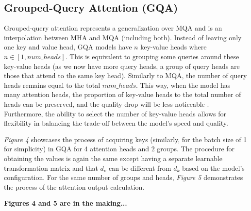 \subsection{Grouped-Query Attention (GQA)}
Grouped-query attention represents a generalization over MQA and is an interpolation between MHA and MQA (including both). Instead of leaving only one key and value head, GQA models have $n$ key-value heads where $n \in [1, num\_heads]$. This is equivalent to grouping some queries around these key-value heads (as we now have more query heads, a group of query heads are those that attend to the same key head). Similarly to MQA, the number of query heads remains equal to the total $num\_heads$. This way, when the model has many attention heads, the proportion of key-value heads to the total number of heads can be preserved, and the quality drop will be less noticeable \cite{ainslie_gqa_2023}. Furthermore, the ability to select the number of key-value heads allows for flexibility in balancing the trade-off between the model's speed and quality. 

\textit{Figure 4} showcases the process of acquiring keys (similarly, for the batch size of 1 for simplicity) in GQA for 4 attention heads and 2 groups. The procedure for obtaining the values is again the same except having a separate learnable transformation matrix and that $d_v$ can be different from $d_k$ based on the model's configuration. For the same number of groups and heads, \textit{Figure 5} demonstrates the process of the attention output calculation.

\textbf{Figures 4 and 5 are in the making...}


